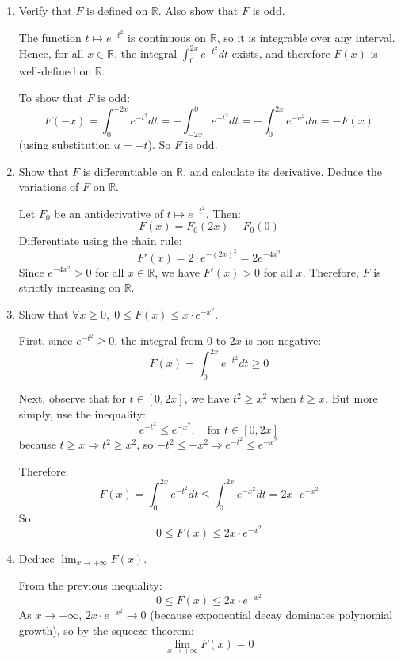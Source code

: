 \documentclass[12pt]{article}
\begin{document}
\newpage

\begin{answerbox}
  \begin{enumerate}
    \item Verify that $ F $ is defined on $ \mathbb{R} $. Also show that $ F $ is odd.

    The function $ t \mapsto e^{-t^2} $ is continuous on $ \mathbb{R} $, so it is integrable over any interval. Hence, for all $ x \in \mathbb{R} $, the integral $ \int_0^{2x} e^{-t^2} dt $ exists, and therefore $ F(x) $ is well-defined on $ \mathbb{R} $.

    To show that $ F $ is odd:
    $$
    F(-x) = \int_0^{-2x} e^{-t^2} dt = -\int_{-2x}^0 e^{-t^2} dt = -\int_0^{2x} e^{-u^2} du = -F(x)
    $$
    (using substitution $ u = -t $). So $ F $ is odd.

    \item Show that $ F $ is differentiable on $ \mathbb{R} $, and calculate its derivative. Deduce the variations of $ F $ on $ \mathbb{R} $.

    Let $ F_0 $ be an antiderivative of $ t \mapsto e^{-t^2} $. Then:
    $$
    F(x) = F_0(2x) - F_0(0)
    $$
    Differentiate using the chain rule:
    $$
    F'(x) = 2 \cdot e^{-(2x)^2} = 2e^{-4x^2}
    $$
    Since $ e^{-4x^2} > 0 $ for all $ x \in \mathbb{R} $, we have $ F'(x) > 0 $ for all $ x $. Therefore, $ F $ is strictly increasing on $ \mathbb{R} $.

    \item Show that $ \forall x \geq 0, \; 0 \leq F(x) \leq x \cdot e^{-x^2} $.

    First, since $ e^{-t^2} \geq 0 $, the integral from 0 to $ 2x $ is non-negative:
    $$
    F(x) = \int_0^{2x} e^{-t^2} dt \geq 0
    $$

    Next, observe that for $ t \in [0, 2x] $, we have $ t^2 \geq x^2 $ when $ t \geq x $. But more simply, use the inequality:
    $$
    e^{-t^2} \leq e^{-x^2}, \quad \text{for } t \in [0, 2x]
    $$
    because $ t \geq x \Rightarrow t^2 \geq x^2 $, so $ -t^2 \leq -x^2 \Rightarrow e^{-t^2} \leq e^{-x^2} $

    Therefore:
    $$
    F(x) = \int_0^{2x} e^{-t^2} dt \leq \int_0^{2x} e^{-x^2} dt = 2x \cdot e^{-x^2}
    $$
    So:
    $$
    0 \leq F(x) \leq 2x \cdot e^{-x^2}
    $$

    \item Deduce $ \lim_{x \to +\infty} F(x) $.

    From the previous inequality:
    $$
    0 \leq F(x) \leq 2x \cdot e^{-x^2}
    $$
    As $ x \to +\infty $, $ 2x \cdot e^{-x^2} \to 0 $ (because exponential decay dominates polynomial growth), so by the squeeze theorem:
    $$
    \lim_{x \to +\infty} F(x) = 0
    $$


\end{enumerate}
\end{answerbox}
\end{document}
